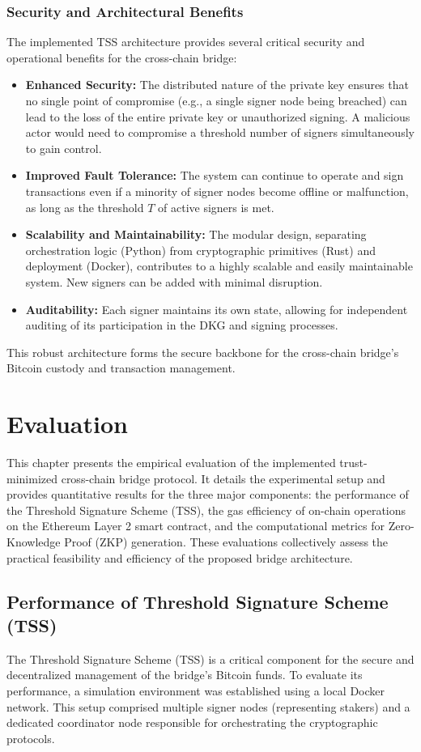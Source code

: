 \documentclass{DESSThesis}
\begin{document}
\subsection{Security and Architectural Benefits}
The implemented TSS architecture provides several critical security and operational benefits for the cross-chain bridge:
\begin{itemize}
    \item \textbf{Enhanced Security:} The distributed nature of the private key ensures that no single point of compromise (e.g., a single signer node being breached) can lead to the loss of the entire private key or unauthorized signing. A malicious actor would need to compromise a threshold number of signers simultaneously to gain control.
    \item \textbf{Improved Fault Tolerance:} The system can continue to operate and sign transactions even if a minority of signer nodes become offline or malfunction, as long as the threshold $T$ of active signers is met.
    \item \textbf{Scalability and Maintainability:} The modular design, separating orchestration logic (Python) from cryptographic primitives (Rust) and deployment (Docker), contributes to a highly scalable and easily maintainable system. New signers can be added with minimal disruption.
    \item \textbf{Auditability:} Each signer maintains its own state, allowing for independent auditing of its participation in the DKG and signing processes.
\end{itemize}
This robust architecture forms the secure backbone for the cross-chain bridge's Bitcoin custody and transaction management.


\chapter{Evaluation} \label{chap:evaluation}
This chapter presents the empirical evaluation of the implemented trust-minimized cross-chain bridge protocol. It details the experimental setup and provides quantitative results for the three major components: the performance of the Threshold Signature Scheme (TSS), the gas efficiency of on-chain operations on the Ethereum Layer 2 smart contract, and the computational metrics for Zero-Knowledge Proof (ZKP) generation. These evaluations collectively assess the practical feasibility and efficiency of the proposed bridge architecture.

\section{Performance of Threshold Signature Scheme (TSS)}
The Threshold Signature Scheme (TSS) is a critical component for the secure and decentralized management of the bridge's Bitcoin funds. To evaluate its performance, a simulation environment was established using a local Docker network. This setup comprised multiple signer nodes (representing stakers) and a dedicated coordinator node responsible for orchestrating the cryptographic protocols.
\end{document}
